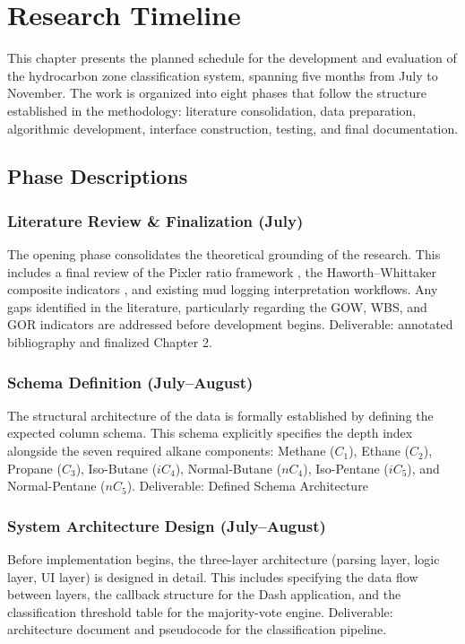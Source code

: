 \chapter{Research Timeline}

This chapter presents the planned schedule for the development and evaluation
of the hydrocarbon zone classification system, spanning five months from July
to November. The work is organized into eight phases that follow the
structure established in the methodology: literature consolidation, data
preparation, algorithmic development, interface construction, testing, and
final documentation.

\section{Phase Descriptions}

\subsection*{Literature Review \& Finalization (July)}
The opening phase consolidates the theoretical grounding of the research.
This includes a final review of the Pixler ratio framework \cite{ref13},
the Haworth--Whittaker composite indicators \cite{haworth1984, haworth1985},
and existing mud logging interpretation workflows. Any gaps identified in
the literature, particularly regarding the GOW, WBS, and GOR indicators are addressed before development begins. Deliverable: annotated bibliography and finalized Chapter 2.

\subsection*{Schema Definition (July--August)}
The structural architecture of the data is formally established by defining the expected column schema. This schema explicitly specifies the depth index alongside the seven required alkane components: Methane ($C_1$), Ethane ($C_2$), Propane ($C_3$), Iso-Butane ($iC_4$), Normal-Butane ($nC_4$), Iso-Pentane ($iC_5$), and Normal-Pentane ($nC_5$). Deliverable: Defined Schema Architecture

\subsection*{System Architecture Design (July--August)}
Before implementation begins, the three-layer architecture (parsing layer,
logic layer, UI layer) is designed in detail. This includes specifying the
data flow between layers, the callback structure for the Dash application,
and the classification threshold table for the majority-vote engine.
Deliverable: architecture document and pseudocode for the classification
pipeline.

